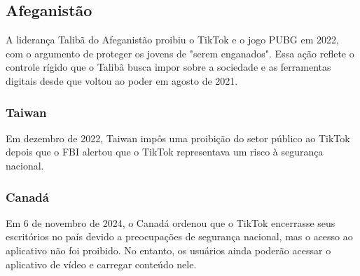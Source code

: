 \subsection{Afeganistão}

A liderança Talibã do Afeganistão proibiu o TikTok e o jogo PUBG em 2022, com o argumento de proteger os jovens de "serem enganados". Essa ação reflete o controle rígido que o Talibã busca impor sobre a sociedade e as ferramentas digitais desde que voltou ao poder em agosto de 2021.


\subsubsection{Taiwan}

Em dezembro de 2022, Taiwan impôs uma proibição do setor público ao TikTok depois que o FBI alertou que o TikTok representava um risco à segurança nacional.


\subsubsection{Canadá}
Em 6 de novembro de 2024, o Canadá ordenou que o TikTok encerrasse seus escritórios no país devido a preocupações de segurança nacional, mas o acesso ao aplicativo não foi proibido. No entanto, os usuários ainda poderão acessar o aplicativo de vídeo e carregar conteúdo nele.







